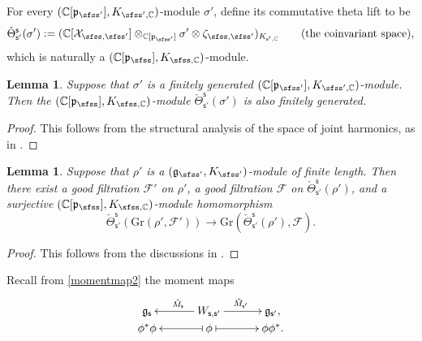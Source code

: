\documentclass[12pt,a4paper]{amsart}
\newcommand{\CF}{{\mathcal {F}}}
\newcommand{\CX}{{\mathcal {X}}}
\newcommand{\g}{\mathfrak g}
\newcommand{\p}{\mathfrak p}
\numberwithin{equation}{section}
\newtheorem{lem}[thm]{Lemma}
\theoremstyle{remark}
\begin{document}
For every  $(\C[\p_{\sfss'}], K_{\sfss', \C})$-module $\sigma'$, define its commutative theta lift to be
\[
   \check \Theta_{\mathsf s'}^{\mathsf s}(\sigma'):=(\C[\CX_{\sfss, \sfss'}]\otimes_{\C[\p_{\sfss'}]} \sigma'\otimes \zeta_{\sfss, \sfss'})_{K_{\mathsf s', \C}} \qquad (\textrm{the  coinvariant space}),
\]
which is naturally a  $(\C[\p_{\sfss}], K_{\sfss, \C})$-module.

\begin{lem}
Suppose that $\sigma'$ is a finitely generated  $(\C[\p_{\sfss'}], K_{\sfss', \C})$-module. Then the  $(\C[\p_{\sfss}], K_{\sfss, \C})$-module   $\check \Theta_{\mathsf s'}^{\mathsf s}(\sigma')$ is also finitely generated.
\end{lem}
\begin{proof} This follows from the structural analysis of the space of joint harmonics, as in \cite[Section 4]{Howe89}. 
\end{proof}

\begin{lem}\label{lm}
Suppose that $\rho'$ is a  $(\g_{\sfss'}, K_{\sfss'})$-module of finite length. Then there exist a good filtration $\CF'$ on $\rho'$, a good filtration $\CF$ on $\check \Theta_{\mathsf s'}^{\mathsf s}(\rho')$, and a surjective $(\C[\p_{\sfss}], K_{\sfss, \C})$-module homomorphism
\[
  \check \Theta_{\mathsf s'}^{\mathsf s}(\mathrm{Gr}(\rho',\CF')) \rightarrow \mathrm{Gr}(\check \Theta_{\mathsf s'}^{\mathsf s}(\rho'),\CF).
\]
\end{lem}
\begin{proof} This follows from the discussions in \cite[Section 3.2]{LM}.
\end{proof}


Recall from \eqref{momentmap2}  the moment maps
\[
    \xymatrix@R=0em@C=3em{
      \g_\mathsf s &\ar[l]_{\tilde M_\mathsf s} W_{\mathsf s, \mathsf s'}\ar[r]^{\tilde M_{\mathsf s'}}& \g_{\mathsf s'},\\
     \phi^* \phi & \ar@{|->}[l] \phi \ar@{|->}[r] & \phi \phi^*.
    }
  \]
\end{document}
